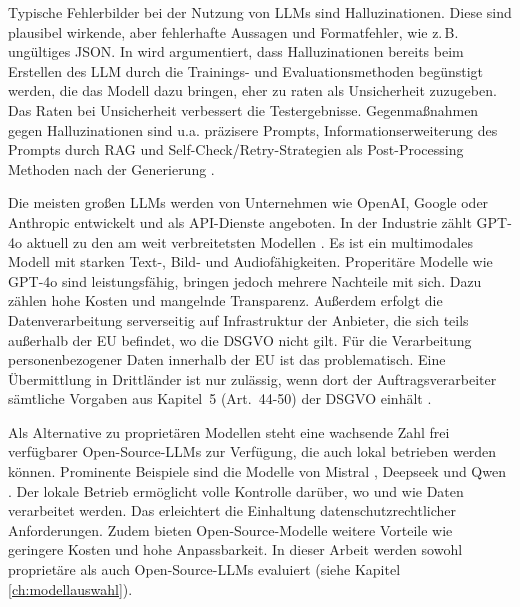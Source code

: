 Typische Fehlerbilder bei der Nutzung von \acp{LLM} sind Halluzinationen. Diese sind plausibel wirkende, aber fehlerhafte Aussagen und Formatfehler, wie z.\,B. ungültiges JSON. In \cite{kalai2025languagemodelshallucinate} wird argumentiert, dass Halluzinationen bereits beim Erstellen des \ac{LLM} durch die Trainings- und Evaluationsmethoden begünstigt werden, die das Modell dazu bringen, eher zu raten als Unsicherheit zuzugeben. Das Raten bei Unsicherheit verbessert die Testergebnisse. Gegenmaßnahmen gegen Halluzinationen sind u.a. präzisere Prompts, Informationserweiterung des Prompts durch \ac{RAG} und Self-Check/Retry-Strategien als Post-Processing Methoden nach der Generierung \cite{ji2023hallucinationsurvey}.

Die meisten großen \acp{LLM} werden von Unternehmen wie OpenAI, Google oder Anthropic entwickelt und als API-Dienste angeboten. In der Industrie zählt GPT-4o aktuell zu den am weit verbreitetsten Modellen \cite{openai-hello-gpt-4o}. Es ist ein multimodales Modell mit starken Text-, Bild- und Audiofähigkeiten. Properitäre Modelle wie GPT-4o sind leistungsfähig, bringen jedoch mehrere Nachteile mit sich. Dazu zählen hohe Kosten und mangelnde Transparenz. Außerdem erfolgt die Datenverarbeitung serverseitig auf Infrastruktur der Anbieter, die sich teils außerhalb der \ac{EU} befindet, wo die \ac{DSGVO} nicht gilt. Für die Verarbeitung personenbezogener Daten innerhalb der \ac{EU} ist das problematisch. Eine Übermittlung in Drittländer ist nur zulässig, wenn dort der Auftragsverarbeiter sämtliche Vorgaben aus Kapitel~5 (Art.~44-50) der \ac{DSGVO} einhält \cite{GDPR2016}.

Als Alternative zu proprietären Modellen steht eine wachsende Zahl frei verfügbarer Open-Source-\acp{LLM} zur Verfügung, die auch lokal betrieben werden können. Prominente Beispiele sind die Modelle von Mistral \cite{mistralai}, Deepseek \cite{deepseek} und Qwen \cite{qwen}. Der lokale Betrieb ermöglicht volle Kontrolle darüber, wo und wie Daten verarbeitet werden. Das erleichtert die Einhaltung datenschutzrechtlicher Anforderungen. Zudem bieten Open-Source-Modelle weitere Vorteile wie geringere Kosten und hohe Anpassbarkeit. In dieser Arbeit werden sowohl proprietäre als auch Open-Source-\acp{LLM} evaluiert (siehe Kapitel \ref{ch:modellauswahl}).